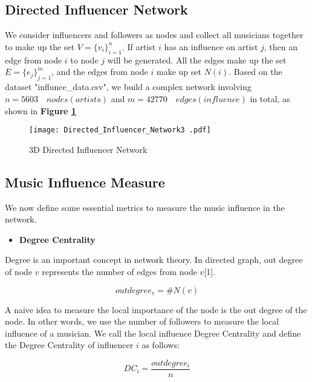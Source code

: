 \documentclass[12pt]{article}  %
\begin{document}
	\subsection{Directed Influencer Network}
	
	We consider influencers and followers as nodes and collect all musicians together to make up the set $V = {\{v_{i}\}}^n_{i=1}$. If artist $i$ has an influence on artist $j$, then an edge from node $i$ to node $j$ will be generated. All the edges make up the set $E = {\{e_{j}\}}^m_{j=1}$, and the edges from node $i$ make up set $N(i)$. Based on the dataset "influnce\_data.csv", we build a complex network involving $n=5603\quad nodes(artists)$ and $m=42770\quad edges(influence)$ in total, as shown in \textbf{Figure \ref{fig:in_network}}
	
	\begin{figure}[htbp]
		\centering
		\texttt{[image: Directed\_Influencer\_Network3 .pdf]} 	%
		\caption{3D Directed Influencer Network}		%
		\label{fig:in_network}							%
	\end{figure}
	
	\subsection{Music Influence Measure}
	
	We now define some essential metrics to measure the music influence in the network.
	
	\begin{itemize}
		\item \textbf{Degree Centrality} 
	\end{itemize}
	
	Degree is an important concept in network theory. In directed graph, out degree of node $ v $ represents the number of edges from node $ v $[1].
	
	\begin{equation}\label{eq:outdegree}
		outdegree_v=\# N(v)
	\end{equation}
	
	A naive idea to measure the local importance of the node is the out degree of the node. In other words, we use the number of followers to measure the local influence of a musician. We call the local influence Degree Centrality and define the Degree Centrality of influencer $ i $ as follows:
	
	\begin{equation}\label{eq:outegree}
		DC_i=\frac{outdegree_i}{n}	
	\end{equation}
	
\end{document}
